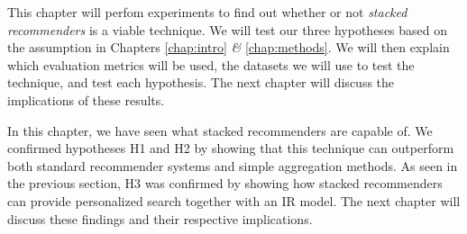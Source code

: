 \label{chap:results}

This chapter will perfom experiments to find out whether or not
\emph{stacked recommenders} is a viable technique.
We will test our three hypotheses based on the assumption in Chapters 
\ref{chap:intro} \emph{\&} \ref{chap:methods}.
We will then explain which evaluation metrics will be used,
the datasets we will use to test the technique,
and test each hypothesis.
The next chapter will discuss the implications of these results.







\hr

In this chapter, we have seen what stacked recommenders are capable of.
We confirmed hypotheses H1 and H2 by showing that this technique
can outperform both standard recommender systems and 
simple aggregation methods. As seen in the previous section,
H3 was confirmed by showing how stacked recommenders can provide
personalized search together with an IR model.
The next chapter will discuss these findings and their respective implications.

